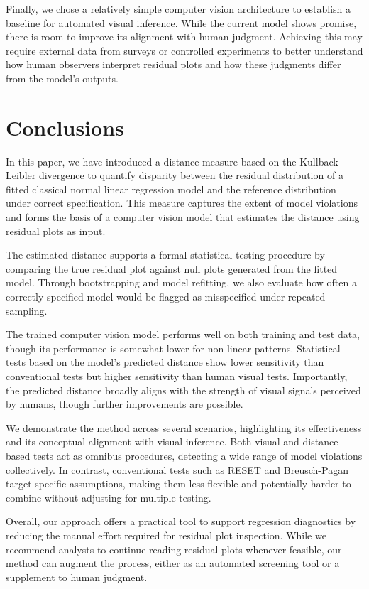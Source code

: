 \documentclass[]{interact}
\theoremstyle{plain}%
\theoremstyle{definition}
\theoremstyle{remark}
\begin{document}
Finally, we chose a relatively simple computer vision architecture to
establish a baseline for automated visual inference. While the current
model shows promise, there is room to improve its alignment with human
judgment. Achieving this may require external data from surveys or
controlled experiments to better understand how human observers
interpret residual plots and how these judgments differ from the model's
outputs.

\section{Conclusions}\label{conclusions}

In this paper, we have introduced a distance measure based on the
Kullback-Leibler divergence to quantify disparity between the residual
distribution of a fitted classical normal linear regression model and
the reference distribution under correct specification. This measure
captures the extent of model violations and forms the basis of a
computer vision model that estimates the distance using residual plots
as input.

The estimated distance supports a formal statistical testing procedure
by comparing the true residual plot against null plots generated from
the fitted model. Through bootstrapping and model refitting, we also
evaluate how often a correctly specified model would be flagged as
misspecified under repeated sampling.

The trained computer vision model performs well on both training and
test data, though its performance is somewhat lower for non-linear
patterns. Statistical tests based on the model's predicted distance show
lower sensitivity than conventional tests but higher sensitivity than
human visual tests. Importantly, the predicted distance broadly aligns
with the strength of visual signals perceived by humans, though further
improvements are possible.

We demonstrate the method across several scenarios, highlighting its
effectiveness and its conceptual alignment with visual inference. Both
visual and distance-based tests act as omnibus procedures, detecting a
wide range of model violations collectively. In contrast, conventional
tests such as RESET and Breusch-Pagan target specific assumptions,
making them less flexible and potentially harder to combine without
adjusting for multiple testing.

Overall, our approach offers a practical tool to support regression
diagnostics by reducing the manual effort required for residual plot
inspection. While we recommend analysts to continue reading residual
plots whenever feasible, our method can augment the process, either as
an automated screening tool or a supplement to human judgment.
\end{document}
